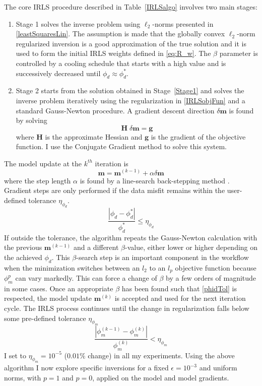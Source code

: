 The core IRLS procedure described in Table~\ref{IRLSalgo} involves two main stages:
\begin{enumerate}
\item \label{Stage1} Stage 1 solves the inverse problem using $\ell_2$-norms presented in \eqref{leastSquaresLin}. The assumption is made that the globally convex $\ell_2$-norm regularized inversion is a good approximation of the true solution and it is used to form the initial IRLS weights defined in \eqref{eq:R_w}. The $\beta$ parameter is controlled by a cooling schedule that starts with a high value and is successively decreased until $\phi_d \approx \phi_d^*$.

\item \label{Stage2} Stage 2 starts from the solution obtained in Stage~\ref{Stage1} and solves the inverse problem iteratively using the regularization in \eqref{IRLSobjFun} and a standard Gauss-Newton procedure. A gradient descent direction $\delta \mathbf{m}$ is found by solving
\begin{equation}\label{GaussNewtStep}
\mathbf{H}\; \delta \mathbf{m} = \mathbf{g}
\end{equation}
where $\mathbf{H}$ is the approximate Hessian and $\mathbf{g}$ is the gradient of the objective function. I use the Conjugate Gradient method \cite[]{HestenesStiefel1952} to solve this system.
\end{enumerate}
The model update at the $k^{th}$ iteration is
\begin{equation}\label{GNmodelUpdate}
\mathbf{m} = \mathbf{m}^{(k-1)} + \alpha \delta \mathbf{m}
\end{equation}
where the step length $\alpha$ is found by a line-search back-stepping method \cite[]{NocedalWright99}.
Gradient steps are only performed if the data misfit remains within the user-defined tolerance $\eta_{\phi_d}$.
\begin{equation}\label{phidTol}
\frac{|\phi_d- \phi_d^*|}{\phi_d^*} \leq \eta_{\phi_d}
\end{equation}
If outside the tolerance, the algorithm repeats the Gauss-Newton calculation with the previous $\mathbf{m}^{(k-1)}$ and a different $\beta$-value, either lower or higher depending on the achieved $\phi_d$. This $\beta$-search step is an important component in the workflow when the minimization switches between an $l_2$ to an $l_p$ objective function because $\phi_m^p$ can vary markedly. This can force a change of $\beta$ by a few orders of magnitude in some cases.
Once an appropriate $\beta$ has been found such that \eqref{phidTol} is respected, the model update $\mathbf{m}^{(k)}$ is accepted and used for the next iteration cycle. The IRLS process continues until the change in regularization falls below some pre-defined tolerance $\eta_{\phi_m}$
\begin{equation}\label{phimTol}
\frac{|\phi_m^{(k-1)}-\phi_m^{(k)}|}{\phi_m^{(k)}} < \eta_{\phi_m}
\end{equation}
I set to $\eta_{\phi_m} =10^{-5}$ ($0.01\%$ change) in all my experiments.
Using the above algorithm I now explore specific inversions for a fixed $\epsilon=10^{-3}$ and uniform norms, with $p=1$ and $p=0$, applied on the model and model gradients.

